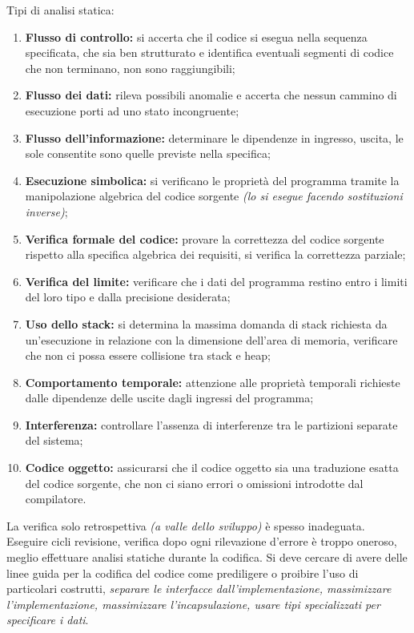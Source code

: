 Tipi di analisi statica:
\begin{enumerate}
	\item \textbf{Flusso di controllo:} si accerta che il codice si esegua nella sequenza specificata, che sia ben strutturato e identifica eventuali segmenti di codice che non terminano, non sono raggiungibili;
	\item \textbf{Flusso dei dati:} rileva possibili anomalie e accerta che nessun cammino di esecuzione porti ad uno stato incongruente;
	\item \textbf{Flusso dell'informazione:} determinare le dipendenze in ingresso, uscita, le sole consentite sono quelle previste nella specifica;
	\item \textbf{Esecuzione simbolica:} si verificano le proprietà del programma tramite la manipolazione algebrica del codice sorgente \textit{(lo si esegue facendo sostituzioni inverse)};
	\item \textbf{Verifica formale del codice:} provare la correttezza del codice sorgente rispetto alla specifica algebrica dei requisiti, si verifica la correttezza parziale;
	\item \textbf{Verifica del limite:} verificare che i dati del programma restino entro i limiti del loro tipo e dalla precisione desiderata;
	\item \textbf{Uso dello stack:} si determina la massima domanda di stack richiesta da un'esecuzione in relazione con la dimensione dell'area di memoria, verificare che non ci possa essere collisione tra stack e heap;
	\item \textbf{Comportamento temporale:} attenzione alle proprietà temporali richieste dalle dipendenze delle uscite dagli ingressi del programma;
	\item \textbf{Interferenza:} controllare l'assenza di interferenze tra le partizioni separate del sistema;
	\item \textbf{Codice oggetto:} assicurarsi che il codice oggetto sia una traduzione esatta del codice sorgente, che non ci siano errori o omissioni introdotte dal compilatore.
\end{enumerate}
La verifica solo retrospettiva \textit{(a valle dello sviluppo)} è spesso inadeguata.\\

Eseguire cicli revisione, verifica dopo ogni rilevazione d'errore è troppo oneroso, meglio effettuare analisi statiche durante la codifica. Si deve cercare di avere delle linee guida per la codifica del codice come prediligere o proibire l'uso di particolari costrutti, \textit{separare le interfacce dall'implementazione, massimizzare l'implementazione, massimizzare l'incapsulazione, usare tipi specializzati per specificare i dati}.


